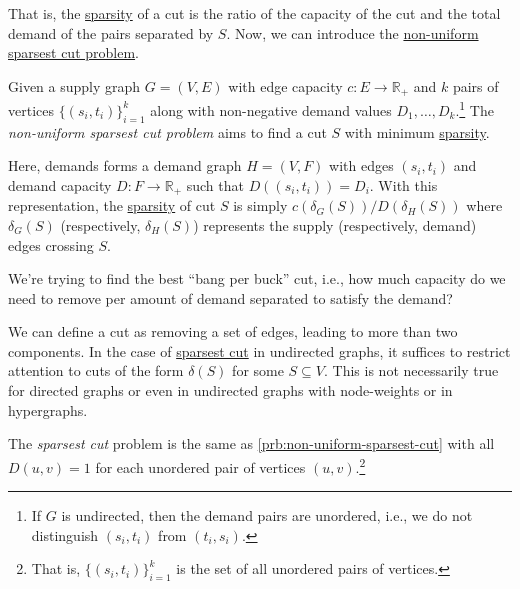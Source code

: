 That is, the \hyperref[def:sparsity]{sparsity} of a cut is the ratio of the capacity of the cut and the total demand of the pairs separated by \(S\). Now, we can introduce the \hyperref[prb:non-uniform-sparsest-cut]{non-uniform sparsest cut problem}.

\begin{problem}\label{prb:non-uniform-sparsest-cut}
Given a supply graph \(G = (V, E)\) with edge capacity \(c \colon E \to \mathbb{R} _+\) and \(k\) pairs of vertices \(\{ (s_i, t_i) \} _{i=1}^{k}\) along with non-negative demand values \(D_1, \dots , D_k\).\footnote{If \(G\) is undirected, then the demand pairs are unordered, i.e., we do not distinguish \((s_i, t_i)\) from \((t_i, s_i)\).} The \emph{non-uniform sparsest cut problem} aims to find a cut \(S\) with minimum \hyperref[def:sparsity]{sparsity}.
\end{problem}

Here, demands forms a demand graph \(H = (V, F)\) with edges \((s_i, t_i)\) and demand capacity \(D\colon F \to \mathbb{R} _+\) such that \(D((s_i, t_i)) = D_i\). With this representation, the \hyperref[def:sparsity]{sparsity} of cut \(S\) is simply \(c(\delta _G(S)) / D(\delta _H(S))\) where \(\delta _G(S)\) (respectively, \(\delta _H(S)\)) represents the supply (respectively, demand) edges crossing \(S\).

\begin{intuition}
	We're trying to find the best ``bang per buck''	cut, i.e., how much capacity do we need to remove per amount of demand separated to satisfy the demand?
\end{intuition}

\begin{remark}
	We can define a cut as removing a set of edges, leading to more than two components. In the case of \hyperref[prb:non-uniform-sparsest-cut]{sparsest cut} in undirected graphs, it suffices to restrict attention to cuts of the form \(\delta (S)\) for some \(S \subseteq V\). This is not necessarily true for directed graphs or even in undirected graphs with node-weights or in hypergraphs.
\end{remark}

\begin{problem}\label{prb:sparsest-cut}
The \emph{sparsest cut} problem is the same as \autoref{prb:non-uniform-sparsest-cut} with all \(D(u, v) = 1\) for each unordered pair of vertices \((u, v)\).\footnote{That is, \(\{ (s_i, t_i) \} _{i=1}^{k}\) is the set of all unordered pairs of vertices.}
\end{problem}

